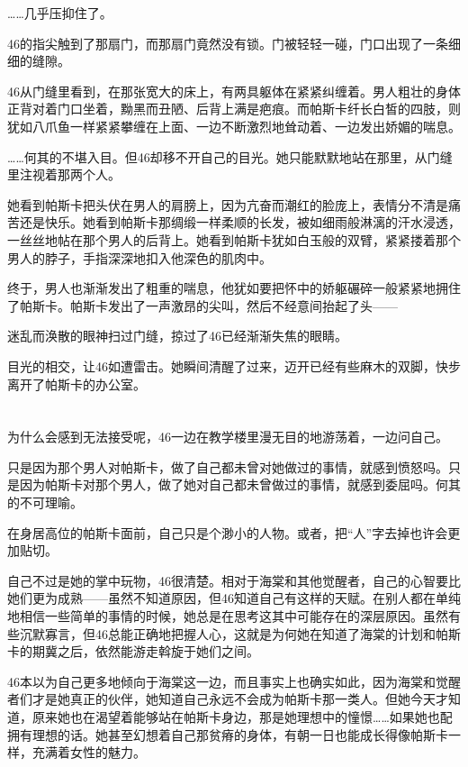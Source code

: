 ……几乎压抑住了。

46的指尖触到了那扇门，而那扇门竟然没有锁。门被轻轻一碰，门口出现了一条细细的缝隙。

46从门缝里看到，在那张宽大的床上，有两具躯体在紧紧纠缠着。男人粗壮的身体正背对着门口坐着，黝黑而丑陋、后背上满是疤痕。而帕斯卡纤长白皙的四肢，则犹如八爪鱼一样紧紧攀缠在上面、一边不断激烈地耸动着、一边发出娇媚的喘息。

……何其的不堪入目。但46却移不开自己的目光。她只能默默地站在那里，从门缝里注视着那两个人。

她看到帕斯卡把头伏在男人的肩膀上，因为亢奋而潮红的脸庞上，表情分不清是痛苦还是快乐。她看到帕斯卡那绸缎一样柔顺的长发，被如细雨般淋漓的汗水浸透，一丝丝地帖在那个男人的后背上。她看到帕斯卡犹如白玉般的双臂，紧紧搂着那个男人的脖子，手指深深地扣入他深色的肌肉中。

终于，男人也渐渐发出了粗重的喘息，他犹如要把怀中的娇躯碾碎一般紧紧地拥住了帕斯卡。帕斯卡发出了一声激昂的尖叫，然后不经意间抬起了头——

迷乱而涣散的眼神扫过门缝，掠过了46已经渐渐失焦的眼睛。

目光的相交，让46如遭雷击。她瞬间清醒了过来，迈开已经有些麻木的双脚，快步离开了帕斯卡的办公室。

\section*{}

为什么会感到无法接受呢，46一边在教学楼里漫无目的地游荡着，一边问自己。

只是因为那个男人对帕斯卡，做了自己都未曾对她做过的事情，就感到愤怒吗。只是因为帕斯卡对那个男人，做了她对自己都未曾做过的事情，就感到委屈吗。何其的不可理喻。

在身居高位的帕斯卡面前，自己只是个渺小的人物。或者，把“人”字去掉也许会更加贴切。

自己不过是她的掌中玩物，46很清楚。相对于海棠和其他觉醒者，自己的心智要比她们更为成熟——虽然不知道原因，但46知道自己有这样的天赋。在别人都在单纯地相信一些简单的事情的时候，她总是在思考这其中可能存在的深层原因。虽然有些沉默寡言，但46总能正确地把握人心，这就是为何她在知道了海棠的计划和帕斯卡的期冀之后，依然能游走斡旋于她们之间。

46本以为自己更多地倾向于海棠这一边，而且事实上也确实如此，因为海棠和觉醒者们才是她真正的伙伴，她知道自己永远不会成为帕斯卡那一类人。但她今天才知道，原来她也在渴望着能够站在帕斯卡身边，那是她理想中的憧憬……如果她也配拥有理想的话。她甚至幻想着自己那贫瘠的身体，有朝一日也能成长得像帕斯卡一样，充满着女性的魅力。

